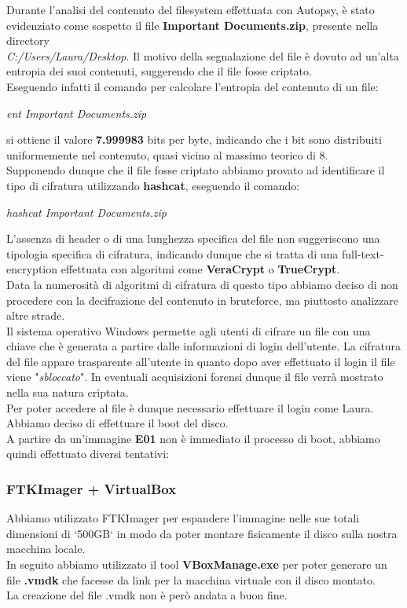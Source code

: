 Durante l'analisi del contenuto del filesystem effettuata con Autopsy, è stato evidenziato come sospetto il file \textbf{Important Documents.zip}, presente nella directory\\
\textit{C:/Users/Laura/Desktop}. Il motivo della segnalazione del file è dovuto ad un'alta entropia dei suoi contenuti, suggerendo che il file fosse criptato.\\
Eseguendo infatti il comando per calcolare l'entropia del contenuto di un file:
\begin{center}
    \textit{ent Important Documents.zip}
\end{center}
si ottiene il valore \textbf{7.999983} bits per byte, indicando che i bit sono distribuiti uniformemente nel contenuto, quasi vicino al massimo teorico di 8.\vspace{14pt}\\
Supponendo dunque che il file fosse criptato abbiamo provato ad identificare il tipo di cifratura utilizzando \textbf{hashcat}, eseguendo il comando:
\begin{center}
    \textit{hashcat Important Documents.zip}
\end{center}
L'assenza di header o di una lunghezza specifica del file non suggeriscono una tipologia specifica di cifratura, indicando dunque che si tratta di una full-text-encryption effettuata con algoritmi come \textbf{VeraCrypt} o \textbf{TrueCrypt}.\\
Data la numerosità di algoritmi di cifratura di questo tipo abbiamo deciso di non procedere con la decifrazione del contenuto in bruteforce, ma piuttosto analizzare altre strade.\vspace{14pt}\\
Il sistema operativo Windows permette agli utenti di cifrare un file con una chiave che è generata a partire dalle informazioni di login dell'utente. La cifratura del file appare trasparente all'utente in quanto dopo aver effettuato il login il file viene "\textit{sbloccato}". In eventuali acquisizioni forensi dunque il file verrà mostrato nella sua natura criptata.\vspace{14pt}\\
Per poter accedere al file è dunque necessario effettuare il login come Laura. Abbiamo deciso di effettuare il boot del disco.\vspace{14pt}\\
A partire da un'immagine \textbf{E01} non è immediato il processo di boot, abbiamo quindi effettuato diversi tentativi:
\subsubsection{FTKImager + VirtualBox}
Abbiamo utilizzato FTKImager per espandere l'immagine nelle sue totali dimensioni di `500GB` in modo da poter montare fisicamente il disco sulla nostra macchina locale.\\
In seguito abbiamo utilizzato il tool \textbf{VBoxManage.exe} per poter generare un file \textbf{.vmdk} che facesse da link per la macchina virtuale con il disco montato.\\
La creazione del file .vmdk non è però andata a buon fine.
